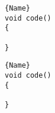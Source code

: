\documentclass[
	a4paper,
	10pt,
	twoside,
	openright,
	notitlepage,
	parskip=half,
]{scrreprt}
\begin{document}
\noindent
\begin{minipage}{.45\textwidth}
	\begin{lstlisting}[caption=code 1,frame=tlrb]{Name}
void code()
{

}
	\end{lstlisting}
\end{minipage}\hfill
\begin{minipage}{.45\textwidth}
	\begin{lstlisting}[caption=code 2,frame=tlrb]{Name}
void code()
{

}
	\end{lstlisting}
\end{minipage}
\end{document}
